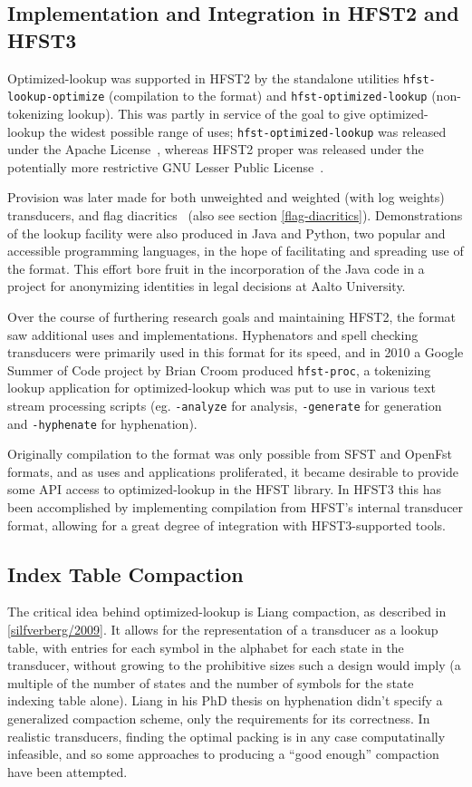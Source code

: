 \documentclass{llncs}
\begin{document}
\subsection{Implementation and Integration in HFST2 and HFST3}
Optimized-lookup was supported in HFST2 by the standalone utilities
\verb+hfst-lookup-optimize+ (compilation to the format) and
\verb+hfst-optimized-lookup+ (non-tokenizing lookup). This was partly
in service of the goal to give optimized-lookup the widest possible range
of uses; \verb+hfst-optimized-lookup+ was released under the
Apache License~\cite{apache-license}, whereas HFST2 proper was released
under the potentially more restrictive GNU Lesser Public
License~\cite{lgpl-license}.

Provision was later made for both unweighted and weighted (with log weights)
transducers, and flag diacritics~\cite{beesley/2003} (also see section
\ref{flag-diacritics}). Demonstrations of the lookup facility were also
produced in Java and Python, two popular and accessible programming languages,
in the hope of facilitating and spreading use of the format. This effort
bore fruit in the incorporation of the Java code in a project for anonymizing
identities in legal decisions at Aalto University.

Over the course of furthering research goals and maintaining HFST2,
the format saw additional uses and implementations. Hyphenators and spell
checking transducers were primarily used in this format for its speed, and
in 2010 a Google Summer of Code project by Brian Croom produced
\verb+hfst-proc+, a tokenizing lookup application for optimized-lookup which
was put to use in various text stream processing scripts (eg.
\verb+-analyze+ for analysis, \verb+-generate+ for generation and
\verb+-hyphenate+ for hyphenation).

Originally compilation to the format was only possible from SFST and OpenFst
formats, and as uses and applications proliferated, it became desirable to
provide some API access to optimized-lookup in the HFST library. In HFST3
this has been accomplished by implementing compilation from HFST's internal
transducer format, allowing for a great degree of integration with
HFST3-supported tools.

\subsection{Index Table Compaction}
The critical idea behind optimized-lookup is Liang compaction, as described in
\ref{silfverberg/2009}. It allows for the representation of a transducer as
a lookup table, with entries for each symbol in the alphabet for each state
in the transducer, without growing to the prohibitive sizes such a design
would imply (a multiple of the number of states and the number of symbols for
the state indexing table alone). Liang in his PhD thesis on hyphenation
\cite{liang/1983} didn't specify a generalized compaction scheme, only the
requirements for its correctness. In realistic transducers, finding the optimal
packing is in any case computatinally infeasible, and so some approaches to
producing a ``good enough'' compaction have been attempted.
\end{document}
